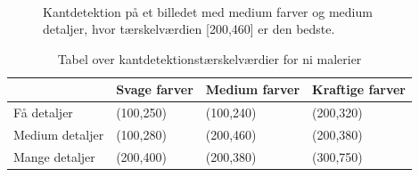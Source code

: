 \begin{figure}[!h]
    \centering
    \\

        \caption[]{Kantdetektion på et billedet med medium farver og
		medium detaljer, hvor tærskelværdien [200,460] er den bedste.}
     \label{tre}
\end{figure}

\begin{table}[!h]
    \centering
    \begin{tabular}{| l | l | l | l |} \hline
        & Svage farver 	& Medium farver & Kraftige farver \\ \hline
        Få detaljer 		& (100,250)		& (100,240)		& (200,320)\\ \hline
        Medium detaljer 	& (100,280)		& (200,460)		& (200,380)\\ \hline
        Mange detaljer		& (200,400)		& (200,380)		& (300,750)\\ \hline
    \end{tabular}
    \caption{Tabel over kantdetektionstærskelværdier for ni malerier}
    \label{thressholdsTabelKant}
\end{table}

